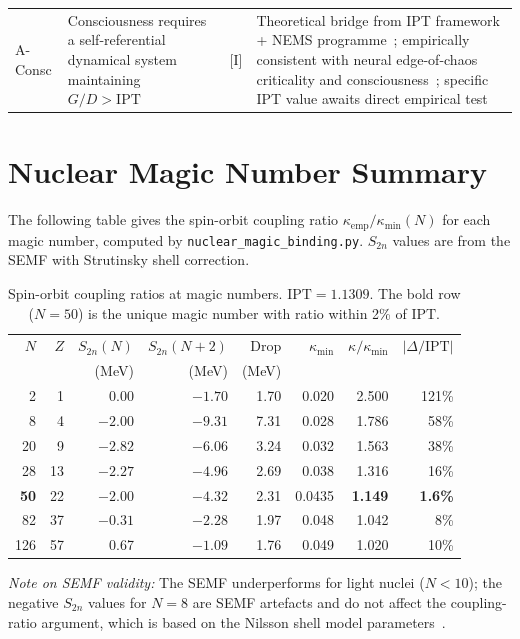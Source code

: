 \documentclass[11pt]{article}
\theoremstyle{remark}
\newcommand{\IPT}{\mathrm{IPT}}
\begin{document}
\begin{longtable}{@{}p{}p{}p{}p{}@{}}
A-Consc &
  Consciousness requires a self-referential dynamical system maintaining
  $G/D > \IPT$ &
  [I] &
  Theoretical bridge from IPT framework + NEMS programme~\cite{SpivackNEMSHub};
  empirically consistent with neural edge-of-chaos criticality and
  consciousness~\cite{Toker2022,Maschke2024,Wiesenhuetter2022,Shew2013};
  specific IPT value awaits direct empirical test \\
\end{longtable}

\section{Nuclear Magic Number Summary}
\label{app:nuclear}

The following table gives the spin-orbit coupling ratio $\kappa_\mathrm{emp}/\kappa_\mathrm{min}(N)$
for each magic number, computed by \texttt{nuclear\_magic\_binding.py}.
$S_{2n}$ values are from the SEMF with Strutinsky shell correction.

\renewcommand{\arraystretch}{1.2}
\begin{table}[H]
\centering
\small
\begin{tabular}{@{}rrrrrrrr@{}}
\toprule
$N$ & $Z$ & $S_{2n}(N)$ & $S_{2n}(N{+}2)$ & Drop & $\kappa_\mathrm{min}$ & $\kappa/\kappa_\mathrm{min}$ & $|\Delta/\IPT|$ \\
 & & (MeV) & (MeV) & (MeV) & & & \\
\midrule
  2 &  1 &  0.00 & $-1.70$ & 1.70 & 0.020 & 2.500 & 121\% \\
  8 &  4 & $-2.00$ & $-9.31$ & 7.31 & 0.028 & 1.786 &  58\% \\
 20 &  9 & $-2.82$ & $-6.06$ & 3.24 & 0.032 & 1.563 &  38\% \\
 28 & 13 & $-2.27$ & $-4.96$ & 2.69 & 0.038 & 1.316 &  16\% \\
 \textbf{50} & 22 & $-2.00$ & $-4.32$ & 2.31 & 0.0435 & \textbf{1.149} & \textbf{1.6\%} \\
 82 & 37 & $-0.31$ & $-2.28$ & 1.97 & 0.048 & 1.042 &   8\% \\
126 & 57 &  0.67 & $-1.09$ & 1.76 & 0.049 & 1.020 &  10\% \\
\bottomrule
\end{tabular}
\caption{Spin-orbit coupling ratios at magic numbers. $\IPT = 1.1309$.
The bold row ($N=50$) is the unique magic number with ratio within 2\% of $\IPT$.}
\label{tab:nuclear_summary}
\end{table}

\noindent\emph{Note on SEMF validity:} The SEMF underperforms for light nuclei
($N < 10$); the negative $S_{2n}$ values for $N=8$ are SEMF artefacts and do not
affect the coupling-ratio argument, which is based on the Nilsson shell model
parameters~\cite{spivack2025nuclear_physics}.
\end{document}
